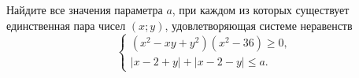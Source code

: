 \begin{ex}
	\begin{condition}
		Найдите все значения параметра \( a \), при каждом из которых существует единственная пара чисел \( (x;y) \), удовлетворяющая системе неравенств
		\[ \left\{
		\begin{array}{l}
			(x^2-xy+y^2)(x^2-36)\ge0,\\
			|x-2+y|+|x-2-y|\le a.
		\end{array}
		\right. \]
	\end{condition}
	\answer{\( a \in [4;8) \)}
\end{ex}
